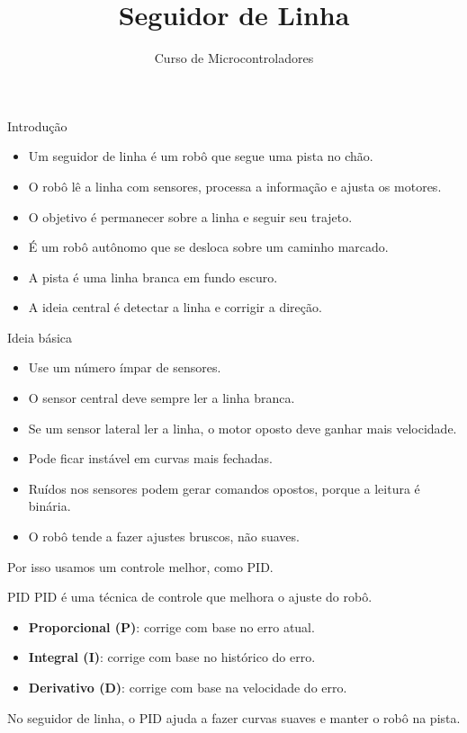 \documentclass[10pt]{beamer}
\title{Seguidor de Linha}
\subtitle{Curso de Microcontroladores}
\author{}
\date{}
\begin{document}
\begin{frame}
  \titlepage
\end{frame}

\begin{frame}{Introdução}
  \begin{itemize}
    \item Um seguidor de linha é um robô que segue uma pista no chão.
    \item O robô lê a linha com sensores, processa a informação e ajusta os motores.
    \item O objetivo é permanecer sobre a linha e seguir seu trajeto.
    \item É um robô autônomo que se desloca sobre um caminho marcado.
    \item A pista é uma linha branca em fundo escuro.
    \item A ideia central é detectar a linha e corrigir a direção.
  \end{itemize}
\end{frame}

\begin{frame}{Ideia básica}
  \begin{itemize}
    \item Use um número ímpar de sensores.
    \item O sensor central deve sempre ler a linha branca.
    \item Se um sensor lateral ler a linha, o motor oposto deve ganhar mais velocidade.

    \item Pode ficar instável em curvas mais fechadas.
    \item Ruídos nos sensores podem gerar comandos opostos, porque a leitura é binária.
    \item O robô tende a fazer ajustes bruscos, não suaves.
  \end{itemize}
  \vspace{0.4cm}
  Por isso usamos um controle melhor, como PID.
\end{frame}

\begin{frame}{PID}
  PID é uma técnica de controle que melhora o ajuste do robô.

  \begin{itemize}
    \item \textbf{Proporcional (P)}: corrige com base no erro atual.
    \item \textbf{Integral (I)}: corrige com base no histórico do erro.
    \item \textbf{Derivativo (D)}: corrige com base na velocidade do erro.
  \end{itemize}

  \pause

  No seguidor de linha, o PID ajuda a fazer curvas suaves e manter o robô na pista.
\end{frame}
\end{document}
